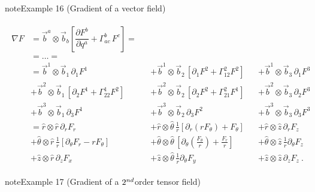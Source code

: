 \documentclass[letterpaper,10pt,english]{jupyterBook}
\begin{document}
\begin{sphinxadmonition}{note}{Example 16 (Gradient of a vector field)}




\begin{equation*}
\begin{split}\begin{aligned}
  \nabla F 
  & = \vec{b}^a \otimes \vec{b}_b \left[ \dfrac{\partial F^b}{\partial q^a} + \Gamma_{ac}^b \, F^c \right] = \\
  & = \dots = \\
  & =  \vec{b}^1 \otimes \vec{b}_1 \, \partial_1 F^1 
  && + \vec{b}^1 \otimes \vec{b}_2 \, \left[ \partial_1 F^2 + \Gamma_{12}^2 F^2 \right]
  && + \vec{b}^1 \otimes \vec{b}_3 \, \partial_1 F^3 \\
  &  + \vec{b}^2 \otimes \vec{b}_1 \, \left[ \partial_2 F^1 + \Gamma_{22}^1 F^2 \right]
  && + \vec{b}^2 \otimes \vec{b}_2 \, \left[ \partial_2 F^2 + \Gamma_{21}^2 F^1 \right]
  && + \vec{b}^2 \otimes \vec{b}_3 \, \partial_2 F^3 \\
  &  + \vec{b}^3 \otimes \vec{b}_1 \, \partial_3 F^1 
  && + \vec{b}^3 \otimes \vec{b}_2 \, \partial_3 F^2 
  && + \vec{b}^3 \otimes \vec{b}_3 \, \partial_3 F^3 \\
  &  = \hat{r     } \otimes \hat{r     } \, \partial_r F_r   
  && + \hat{r     } \otimes \hat{\theta} \, \frac{1}{r} \left[ \partial_r (r F_{\theta}) + F_{\theta} \right]
  && + \hat{r     } \otimes \hat{z     } \, \partial_r F_z \\
  &  + \hat{\theta} \otimes \hat{r     } \, \frac{1}{r} \left[ \partial_\theta F_r - r F_{\theta} \right]
  && + \hat{\theta} \otimes \hat{\theta} \, \left[ \partial_\theta \left( \frac{F_\theta}{r} \right) + \frac{F_r}{r} \right]
  && + \hat{\theta} \otimes \hat{z     } \, \frac{1}{r} \partial_{\theta} F_z \\
  &  + \hat{z     } \otimes \hat{r     } \, \partial_z F_x   
  && + \hat{z     } \otimes \hat{\theta} \, \frac{1}{r} \partial_\theta F_y   
  && + \hat{z     } \otimes \hat{z     } \, \partial_z F_z \ .
\end{aligned}\end{split}
\end{equation*}\end{sphinxadmonition}
\label{ch/tensor-algebra-calculus/calculus-euclidean-cylindrical:example-2}
\begin{sphinxadmonition}{note}{Example 17 (Gradient of a \protect\(2^{nd}\protect\)\sphinxhyphen{}order tensor field)}


\end{sphinxadmonition}
\end{document}
